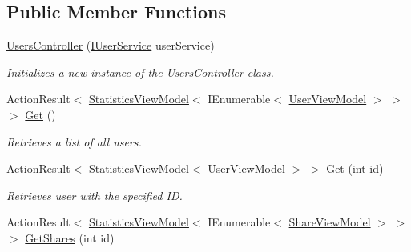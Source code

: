 \subsection*{Public Member Functions}
\begin{DoxyCompactItemize}
\item 
\mbox{\hyperlink{class_gielda_l2_1_1_a_p_i_1_1_controllers_1_1_users_controller_a71d11bc5956c6dc52711977870a28f16}{Users\+Controller}} (\mbox{\hyperlink{interface_gielda_l2_1_1_i_n_f_r_a_s_t_r_u_c_t_u_r_e_1_1_interfaces_1_1_i_user_service}{I\+User\+Service}} user\+Service)
\begin{DoxyCompactList}\small\item\em Initializes a new instance of the \mbox{\hyperlink{class_gielda_l2_1_1_a_p_i_1_1_controllers_1_1_users_controller}{Users\+Controller}} class. \end{DoxyCompactList}\item 
Action\+Result$<$ \mbox{\hyperlink{class_gielda_l2_1_1_a_p_i_1_1_view_models_1_1_view_1_1_statistics_view_model}{Statistics\+View\+Model}}$<$ I\+Enumerable$<$ \mbox{\hyperlink{class_gielda_l2_1_1_a_p_i_1_1_view_models_1_1_view_1_1_user_view_model}{User\+View\+Model}} $>$ $>$ $>$ \mbox{\hyperlink{class_gielda_l2_1_1_a_p_i_1_1_controllers_1_1_users_controller_a763e7ce08170f2681cb87b0a4cd2350a}{Get}} ()
\begin{DoxyCompactList}\small\item\em Retrieves a list of all users. \end{DoxyCompactList}\item 
Action\+Result$<$ \mbox{\hyperlink{class_gielda_l2_1_1_a_p_i_1_1_view_models_1_1_view_1_1_statistics_view_model}{Statistics\+View\+Model}}$<$ \mbox{\hyperlink{class_gielda_l2_1_1_a_p_i_1_1_view_models_1_1_view_1_1_user_view_model}{User\+View\+Model}} $>$ $>$ \mbox{\hyperlink{class_gielda_l2_1_1_a_p_i_1_1_controllers_1_1_users_controller_a0957a53f250fa14681018808613610fe}{Get}} (int id)
\begin{DoxyCompactList}\small\item\em Retrieves user with the specified ID. \end{DoxyCompactList}\item 
Action\+Result$<$ \mbox{\hyperlink{class_gielda_l2_1_1_a_p_i_1_1_view_models_1_1_view_1_1_statistics_view_model}{Statistics\+View\+Model}}$<$ I\+Enumerable$<$ \mbox{\hyperlink{class_gielda_l2_1_1_a_p_i_1_1_view_models_1_1_view_1_1_share_view_model}{Share\+View\+Model}} $>$ $>$ $>$ \mbox{\hyperlink{class_gielda_l2_1_1_a_p_i_1_1_controllers_1_1_users_controller_adbf0440fe0cc3b28ce771a1808e21d8c}{Get\+Shares}} (int id)

\end{DoxyCompactItemize}
